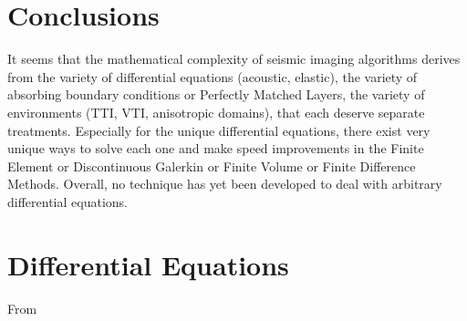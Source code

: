 \newpage
\section{Conclusions}

It seems that the mathematical complexity of seismic imaging algorithms derives from the variety of differential equations (acoustic, elastic), the variety of absorbing boundary conditions or Perfectly Matched Layers, the variety of environments (TTI, VTI, anisotropic domains), that each deserve separate treatments. Especially for the unique differential equations, there exist very unique ways to solve each one and make speed improvements in the Finite Element or Discontinuous Galerkin or Finite Volume or Finite Difference Methods. Overall, no technique has yet been developed to deal with arbitrary differential equations. 


\section{Differential Equations}

From 

